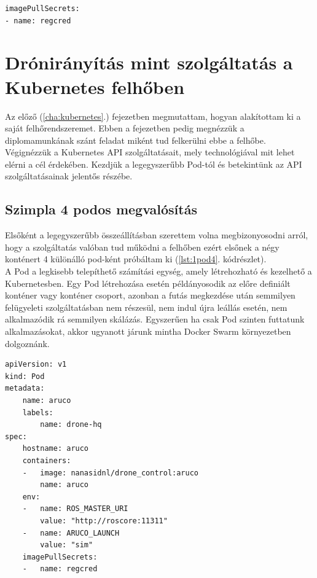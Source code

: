 \begin{minipage}{\linewidth}
\begin{lstlisting}[caption={K8S API secret definiálása a konténerekhez},label={lst:dhsec}]
imagePullSecrets:
- name: regcred
\end{lstlisting}
\end{minipage}


\chapter{Drónirányítás mint szolgáltatás a Kubernetes felhőben}

Az előző (\ref{cha:kubernetes}.) fejezetben megmutattam, hogyan alakítottam ki a saját felhőrendszeremet. Ebben a fejezetben pedig megnézzük a diplomamunkának szánt feladat miként tud felkerülni ebbe a felhőbe. Végignézzük a Kubernetes API szolgáltatásait, mely technológiával mit lehet elérni a cél érdekében. Kezdjük a legegyszerűbb Pod-tól és betekintünk az API szolgáltatásainak jelentős részébe.

\section{Szimpla 4 podos megvalósítás}
Elsőként a legegyszerűbb összeállításban szerettem volna megbizonyosodni arról, hogy a szolgáltatás valóban tud működni a felhőben ezért elsőnek a négy konténert 4 különálló pod-ként próbáltam ki (\ref{lst:1pod4}. kódrészlet). \\

\noindent
A Pod a legkisebb telepíthető számítási egység, amely létrehozható és kezelhető a Kubernetesben. Egy Pod létrehozása esetén példányosodik az előre definiált konténer vagy konténer csoport, azonban a futás megkezdése után semmilyen felügyeleti szolgáltatásban nem részesül, nem indul újra leállás esetén, nem alkalmazódik rá semmilyen skálázás. Egyszerűen ha csak Pod szinten futtatunk alkalmazásokat, akkor ugyanott járunk mintha Docker Swarm környezetben dolgoznánk. \\
\begin{minipage}{\linewidth}
\begin{lstlisting}[caption={Példa egy Pod-ra a négyből},label={lst:1pod4}]
apiVersion: v1
kind: Pod
metadata:
	name: aruco
	labels:
		name: drone-hq
spec:
	hostname: aruco
	containers:
	- 	image: nanasidnl/drone_control:aruco
		name: aruco
	env:
	- 	name: ROS_MASTER_URI
		value: "http://roscore:11311"
	- 	name: ARUCO_LAUNCH
		value: "sim"
	imagePullSecrets:
	-	name: regcred
\end{lstlisting}
\end{minipage}

